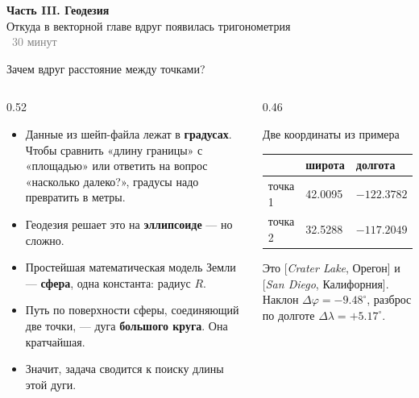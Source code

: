 \documentclass[aspectratio=169,10pt]{beamer}
\begin{document}
\begin{frame}
  \begin{center}
    {\LARGE\bfseries Часть III. Геодезия}\\[0.5em]
    {\large Откуда в векторной главе вдруг появилась тригонометрия}\\[1.5em]
    {\small \textcolor{gray}{~30 минут}}
  \end{center}
\end{frame}

\begin{frame}{Зачем вдруг расстояние между точками?}
\footnotesize
\begin{columns}[T,onlytextwidth]
  \begin{column}{0.52\textwidth}
    \begin{itemize}\itemsep2pt
      \item Данные из шейп-файла лежат в \textbf{градусах}. Чтобы сравнить
            «длину границы» с «площадью» или ответить на вопрос
            «насколько далеко?», градусы надо превратить в метры.
      \item Геодезия решает это на \textbf{эллипсоиде} --- но сложно.
      \item Простейшая математическая модель Земли --- \textbf{сфера},
            одна константа: радиус $R$.
      \item Путь по поверхности сферы, соединяющий две точки, --- дуга
            \textbf{большого круга}. Она кратчайшая.
      \item Значит, задача сводится к поиску длины этой дуги.
    \end{itemize}
  \end{column}
  \begin{column}{0.46\textwidth}
    \begin{block}{Две координаты из примера}\small
      \begin{tabular}{@{}lll@{}}
        \toprule
         & широта & долгота \\
        \midrule
        точка 1 & 42.0095 & $-122.3782$ \\
        точка 2 & 32.5288 & $-117.2049$ \\
        \bottomrule
      \end{tabular}
      \medskip

      Это [\emph{Crater Lake}, Орегон] и [\emph{San Diego}, Калифорния].
      Наклон $\Delta\varphi = -9.48^\circ$, разброс по долготе
      $\Delta\lambda = +5.17^\circ$.
    \end{block}
  \end{column}
\end{columns}
\end{frame}
\end{document}

